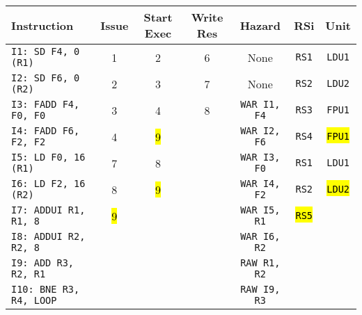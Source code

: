 \begin{enumerate}
    \begin{table}[!htp]
        \centering
        \begin{adjustbox}{width={\textwidth},totalheight={\textheight},keepaspectratio}
        \begin{tabular}{@{} l c c c c c c @{}}
            \toprule
            \textbf{Instruction} & \textbf{Issue} & \textbf{Start Exec} & \textbf{Write Res} & \textbf{Hazard} & \textbf{RSi} & \textbf{Unit} \\
            \midrule
            \texttt{I1: SD F4, 0 (R1)}      & 1 & 2 & 6 & None  & \texttt{RS1}   & \texttt{LDU1}  \\ [.5em]
            \texttt{I2: SD F6, 0 (R2)}      & 2 & 3 & 7 & None  & \texttt{RS2}   & \texttt{LDU2}  \\ [.5em]
            \texttt{I3: FADD F4, F0, F0}    & 3 & 4 & 8 & \texttt{WAR I1, F4}  & \texttt{RS3} & \texttt{FPU1} \\ [.5em]
            \texttt{I4: FADD F6, F2, F2}    & 4 & \hl{9} &   & \texttt{WAR I2, F6} & \texttt{RS4} & \hl{\texttt{FPU1}} \\ [.5em]
            \texttt{I5: LD F0, 16 (R1)}     & 7 & 8 &   & \texttt{WAR I3, F0} & \texttt{RS1} & \texttt{LDU1} \\ [.5em]
            \texttt{I6: LD F2, 16 (R2)}     & 8 & \hl{9} &   & \texttt{WAR I4, F2} & \texttt{RS2} & \hl{\texttt{LDU2}} \\ [.5em]
            \texttt{I7: ADDUI R1, R1, 8}    & \hl{9} &   &   & \texttt{WAR I5, R1} & \hl{\texttt{RS5}} &       \\ [.5em]
            \texttt{I8: ADDUI R2, R2, 8}    &   &   &   & \texttt{WAR I6, R2} &       &       \\ [.5em]
            \texttt{I9: ADD R3, R2, R1}     &   &   &   & \texttt{RAW R1, R2} &       &       \\ [.5em]
            \texttt{I10: BNE R3, R4, LOOP}   &   &   &   & \texttt{RAW I9, R3} &       &       \\
            \bottomrule
        \end{tabular}
        \end{adjustbox}
    \end{table}
    

\end{enumerate}
